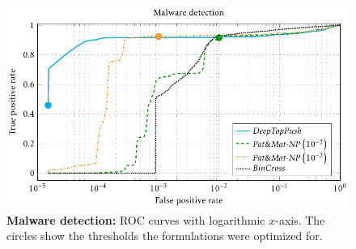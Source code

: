 \begin{figure}
  \centering
  \includegraphics{images/malware_detection.pdf}
  \caption{\textbf{Malware detection:} ROC curves with logarithmic $x$-axis. The circles show the thresholds the formulations were optimized for.}
  \label{fig: malware detection}
\end{figure}
\hfill
